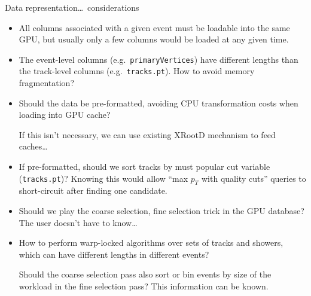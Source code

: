 \documentclass{beamer}
\begin{document}
\begin{frame}{Data representation\ldots\ considerations}
\vspace{0.5 cm}
\scriptsize
\begin{itemize}\setlength{\itemsep}{0.25 cm}
\item All columns associated with a given event must be loadable into the same GPU, but usually only a few columns would be loaded at any given time.

\item The event-level columns (e.g.\ {\tt primaryVertices}) have different lengths than the track-level columns (e.g.\ {\tt tracks.pt}). How to avoid memory fragmentation?

\item Should the data be pre-formatted, avoiding CPU transformation costs when loading into GPU cache?

If this isn't necessary, we can use existing XRootD mechanism to feed caches\ldots

\item If pre-formatted, should we sort tracks by must popular cut variable ({\tt tracks.pt})? Knowing this would allow ``max $p_T$ with quality cuts'' queries to short-circuit after finding one candidate.

\item Should we play the coarse selection, fine selection trick in the GPU database? The user doesn't have to know\ldots

\item How to perform warp-locked algorithms over sets of tracks and showers, which can have different lengths in different events?

Should the coarse selection pass also sort or bin events by size of the workload in the fine selection pass? This information can be known.
\end{itemize}
\end{frame}
\end{document}
